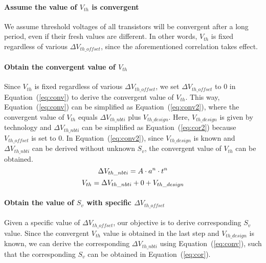 \paragraph{Assume the value of $V_{th}$ is convergent}
We assume threshold voltages of all transistors will be convergent after a long period, even if their fresh values are different. In other words, $V_{th}$ is fixed regardless of various $\Delta V_{th\_offset}$, since the aforementioned correlation takes effect. 

\paragraph{Obtain the convergent value of $V_{th}$}
Since $V_{th}$ is fixed regardless of various $\Delta V_{th\_offset}$, we set $\Delta V_{th\_offset}$ to 0 in Equation~(\ref{eq:conv}) to derive the convergent value of $V_{th}$. This way, Equation~(\ref{eq:conv}) can be simplified as Equation~(\ref{eq:conv2}), where the convergent value of $V_{th}$ equals $\Delta V_{th\_nbti}$ plus $V_{th\_design}$. Here, $V_{th\_design}$ is given by technology and $\Delta V_{th\_nbti}$ can be simplified as Equation~(\ref{eq:cor2}) because $V_{th\_offset}$ is set to 0. In Equation~(\ref{eq:conv2}), since $V_{th\_design}$ is known and $\Delta V_{th\_nbti}$ can be derived without unknown $S_{v}$, the convergent value of $V_{th}$ can be obtained.
\begin{equation}
	\centering
	\Delta V_{th\_nbti} = A \cdot a^n \cdot t^n
	\label{eq:cor2}
\end{equation}
\begin{equation}
	\centering
	V_{th} = \Delta V_{th\_nbti} + 0 + V_{th\_design}
	\label{eq:conv2}
\end{equation}
\paragraph{Obtain the value of $S_{v}$ with specific $\Delta V_{th\_offset}$}
Given a specific value of $\Delta V_{th\_offset}$, our objective is to derive corresponding $S_{v}$ value. Since the convergent $V_{th}$ value is obtained in the last step and $V_{th\_design}$ is known, we can derive the corresponding $\Delta V_{th\_nbti}$ using Equation~(\ref{eq:conv}), such that the corresponding $S_{v}$ can be obtained in Equation~(\ref{eq:cor}). 

